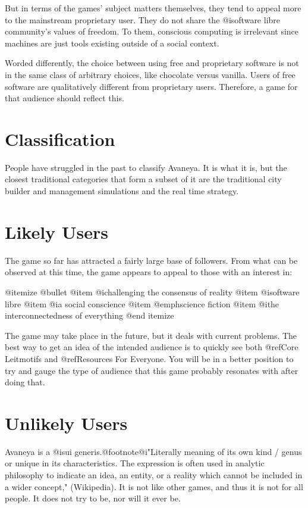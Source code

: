 But in terms of the games' subject matters themselves, they tend to appeal more to the mainstream proprietary user. They do not share the @i{software libre} community's values of freedom. To them, conscious computing is irrelevant since machines are just tools existing outside of a social context. 

Worded differently, the choice between using free and proprietary software is not in the same class of arbitrary choices, like chocolate versus vanilla. Users of free software are qualitatively different from proprietary users. Therefore, a game for that audience should reflect this.

\section{Classification}
People have struggled in the past to classify Avaneya. It is what it is, but the closest traditional categories that form a subset of it are the traditional city builder and management simulations and the real time strategy.

\section{Likely Users}
The game so far has attracted a fairly large base of followers. From what can be observed at this time, the game appears to appeal to those with an interest in:

@itemize @bullet
@item
@i{challenging the consensus of reality}
@item
@i{software libre}
@item 
@i{a social conscience}
@item
@emph{science fiction}
@item
@i{the interconnectedness of everything}
@end itemize

The game may take place in the future, but it deals with current problems. The best way to get an idea of the intended audience is to quickly see both @ref{Core Leitmotifs} and @ref{Resources For Everyone}. You will be in a better position to try and gauge the type of audience that this game probably resonates with after doing that. 

\section{Unlikely Users}
Avaneya is a @i{sui generis}.@footnote{@i{"Literally meaning of its own kind / genus or unique in its characteristics. The expression is often used in analytic philosophy to indicate an idea, an entity, or a reality which cannot be included in a wider concept,"} (Wikipedia).} It is not like other games, and thus it is not for all people. It does not try to be, nor will it ever be.

